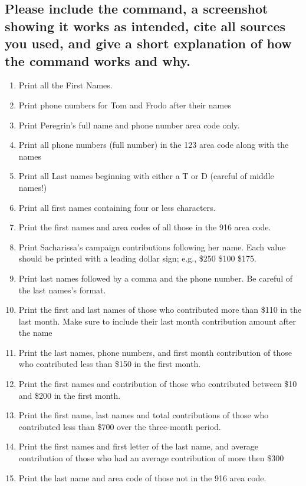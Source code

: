 \documentclass[12pt]{article}
\begin{document}
\subsection*{Please include the command, a screenshot showing it works as intended, cite all sources you used, and give a short explanation of how the command works and why.}
    \begin{enumerate}
        \item Print all the First Names.
        \item Print phone numbers for Tom and Frodo after their names
        \item Print Peregrin's full name and phone number area code only.
        \item Print all phone numbers (full number) in the 123 area code along with the names
        \item Print all Last names beginning with either a T or D (careful of middle names!)
        \item Print all first names containing four or less characters.
        \item Print the first names and area codes of all those in the 916 area code.
        \item Print Sacharissa's campaign contributions following her name. Each value should be printed with a leading dollar sign; e.g., \$250 \$100 \$175.
        \item Print last names followed by a comma and the phone number.  Be careful of the last names's format.
        \item Print the first and last names of those who contributed more than \$110 in the last month. Make sure to include their last month contribution amount after the name
        \item Print the last names, phone numbers, and first month contribution of those who contributed less than \$150 in the first month.
        \item Print the first names and contribution of those who contributed between \$10 and \$200 in the first month.
        \item Print the first name, last names and total contributions of those who contributed less than \$700 over the three-month period.
        \item Print the first names and first letter of the last name, and average contribution of those who had an average contribution of more then \$300
        \item Print the last name and area code of those not in the 916 area code.

\end{enumerate}
\end{document}
